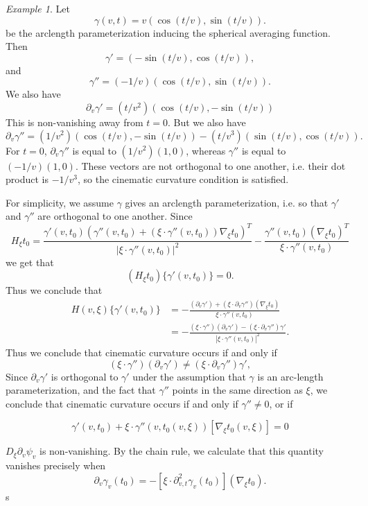 \documentclass{article}
\theoremstyle{plain}
\theoremstyle{remark}
\newtheorem*{example}{Example}
\theoremstyle{definition}
\begin{document}
\begin{example}
Let
%
\[ \gamma(v,t) = v (\cos(t / v), \sin(t / v)). \]
%
be the arclength parameterization inducing the spherical averaging function. Then
%
\[ \gamma' = (-\sin(t/v), \cos(t/v)), \]
%
and
%
\[ \gamma'' = (-1/v) (\cos(t/v), \sin(t/v)). \]
%
We also have
%
\[ \partial_v \gamma' = (t/v^2) ( \cos(t/v), - \sin(t/v) ) \]
%
This is non-vanishing away from $t = 0$. But we also have
%
\[ \partial_v \gamma'' = (1/v^2) (\cos(t/v), - \sin(t/v)) - (t/v^3) ( \sin(t/v), \cos(t/v) ). \]
%
For $t = 0$, $\partial_v \gamma''$ is equal to $(1/v^2)(1, 0)$, whereas $\gamma''$ is equal to $(-1/v)(1,0)$. These vectors are not orthogonal to one another, i.e. their dot product is $-1/v^3$, so the cinematic curvature condition is satisfied.
\end{example}



%
For simplicity, we assume $\gamma$ gives an arclength parameterization, i.e. so that $\gamma'$ and $\gamma''$ are orthogonal to one another. Since
%
\[ H_\xi t_0 = \frac{\gamma'(v,t_0) \left( \gamma''(v,t_0) + (\xi \cdot \gamma''(v,t_0)) \nabla_\xi t_0 \right)^T}{|\xi \cdot \gamma''(v,t_0)|^2} - \frac{\gamma''(v,t_0) (\nabla_\xi t_0)^T}{\xi \cdot \gamma''(v,t_0)} \]
%
we get that
%
\[ (H_\xi t_0) \{ \gamma'(v,t_0) \} = 0. \]
%
Thus we conclude that
%
\begin{align*}
	H(v,\xi) \{ \gamma'(v,t_0) \} &= - \frac{(\partial_v \gamma') + (\xi \cdot \partial_v \gamma'') (\nabla_\xi t_0)}{\xi \cdot \gamma''(v,t_0)}\\
	&= - \frac{( \xi \cdot \gamma'' ) (\partial_v \gamma') - (\xi \cdot \partial_v \gamma'') \gamma'}{|\xi \cdot \gamma''(v,t_0)|^2}.
\end{align*}
%
Thus we conclude that cinematic curvature occurs if and only if
%
\[ (\xi \cdot \gamma'')( \partial_v \gamma' ) \neq (\xi \cdot \partial_v \gamma'') \gamma', \]
%
Since $\partial_v \gamma'$ is orthogonal to $\gamma'$ under the assumption that $\gamma$ is an arc-length parameterization, and the fact that $\gamma''$ points in the same direction as $\xi$, we conclude that cinematic curvature occurs if and only if $\gamma'' \neq 0$, or if 


\[ \gamma'(v,t_0) + \xi \cdot \gamma''(v,t_0(v,\xi)) [\nabla_\xi t_0(v,\xi)] = 0 \]

 $D_\xi \partial_v \psi_v$ is non-vanishing. By the chain rule, we calculate that this quantity vanishes precisely when
%
\[ \partial_v \gamma_v(t_0) = - [\xi \cdot \partial^2_{v,t} \gamma_v(t_0)] (\nabla_\xi t_0). \]
%
s
\end{document}
